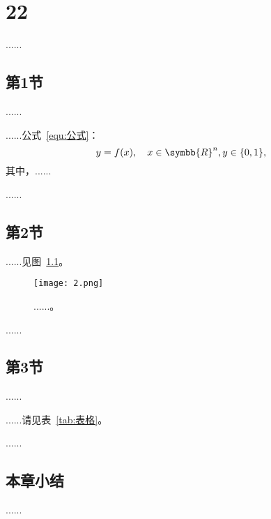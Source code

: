 
\chapter{22}

......

\section{第1节}

......

......公式~\ref{equ:公式}：
\begin{equation}\label{equ:公式}
    y=f(x), \quad x \in \symbb{R}^{n}, y \in \{0,1\},
\end{equation}
其中，......

......

\section{第2节}

......见图~\ref{fig:图像}。

\begin{figure}[!htbp]
    \centering
    \texttt{[image: 2.png]}
    \caption{......。
    }\label{fig:图像}
\end{figure}

......

\section{第3节}

......

......请见表~\ref{tab:表格}。

\begin{table}[!htbp]
    \caption{......。}\label{tab:表格}
    \centering
    \footnotesize
\end{table}

......

\section{本章小结}

......
